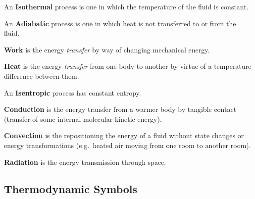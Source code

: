\documentclass[
]{book}
\begin{document}
An \textbf{Isothermal} process is one in which the temperature of the fluid is constant.

An \textbf{Adiabatic} process is one in which heat is not transferred to or from the fluid.

\textbf{Work} is the energy \emph{transfer} by way of changing mechanical energy.

\textbf{Heat} is the energy \emph{transfer} from one body to another by virtue of a temperature difference between them.

An \textbf{Isentropic} process has constant entropy.

\textbf{Conduction} is the energy transfer from a warmer body by tangible contact (transfer of some internal molecular kinetic energy).

\textbf{Convection} is the repositioning the energy of a fluid without state changes or energy transformations (e.g.~heated air moving from one room to another room).

\textbf{Radiation} is the energy transmission through space.

\hypertarget{thermodynamic-symbols}{%
\subsection{Thermodynamic Symbols}\label{thermodynamic-symbols}}
\end{document}
